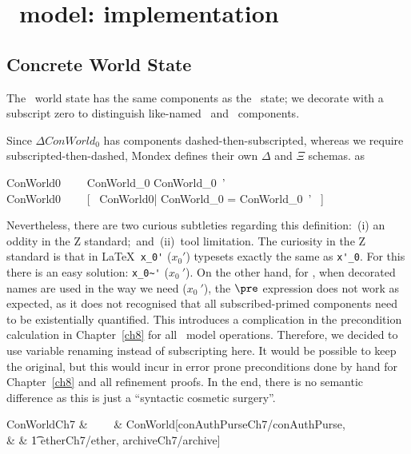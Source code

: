 \chapter{\Conc\ model: implementation}\label{ch7}

\section{Concrete World State}

The \Conc\ world state has the same components as the \Betw\ state;
we decorate with a subscript zero to distinguish like-named \Betw\
and \Conc\ components.

Since $\Delta ConWorld_0$ has components dashed-then-subscripted,
whereas we require subscripted-then-dashed, Mondex defines their own
$\Delta$ and $\Xi$ schemas. as
\newcommand{\DeltaConWorldO}{\Delta ConWorld0}
\newcommand{\XiConWorldO}{\Xi ConWorld0}
%
\begin{gzed}
  \DeltaConWorldO ~~~~ ConWorld_0 \land ConWorld_0~' \\
  \XiConWorldO ~~\defs~~ [~ \DeltaConWorldO | \theta ConWorld_0 = \theta ConWorld_0~' ~]
\end{gzed}
%
Nevertheless, there are two curious subtleties regarding this
definition:~(i) an oddity in the Z standard;~and~(ii)~tool
limitation. The curiosity in the Z standard is that in \LaTeX\
\verb+x_0'+ ($x_0'$) typesets exactly the same as \verb+x'_0+. For
this there is an easy solution: \verb+x_0~'+ ($x_0~'$). On the other
hand, for \zeves, when decorated names are used in the way we need
($x_0~'$), the $\pre$ expression does not work as expected, as it
does not recognised that all subscribed-primed components need to be
existentially quantified. This introduces a complication in the
precondition calculation in Chapter~\ref{ch8} for all \Conc\ model
operations. Therefore, we decided to use variable renaming instead
of subscripting here. It would be possible to keep the original, but
this would incur in error prone preconditions done by hand for
Chapter~\ref{ch8} and all refinement proofs. In the end, there is no
semantic difference as this is just a ``syntactic cosmetic
surgery''.

\begin{LNewSDef}
\begin{syntax}
    ConWorldCh7 & ~~\defs~~& ConWorld[conAuthPurseCh7/conAuthPurse, \\
                &       &  \t1 etherCh7/ether, archiveCh7/archive]
\end{syntax}~\end{LNewSDef}

